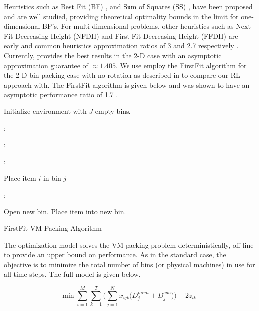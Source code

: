 \documentclass[12pt]{article}
\begin{document}
Heuristics such as Best Fit (BF) \citep{Johnson1974}, and Sum of Squares (SS) \citep{Csirik2006}, have been proposed and are well studied, providing theoretical optimality bounds in the limit for one-dimensional BP's. 
For multi-dimensional problems, other heuristics such as Next Fit Decreasing Height (NFDH) and First Fit Decreasing Height (FFDH) are early and common heuristics approximation ratios of 3 and 2.7 respectively \citep{Christensen2017}. 
Currently, \citet{Bansal2016} provides the best results in the 2-D case with an asymptotic approximation guarantee of $\approx 1.405$.
We use employ the FirstFit algorithm for the 2-D bin packing case with no rotation as described in \cite{Garey1972} to compare our RL approach with.
The FirstFit algorithm is given below and was shown to have an asymptotic performance ratio of 1.7 \citep{Baker1983}.

\begin{algorithm}
\begin{algorithmic}[1]
\Require
Initialize environment with $J$ empty bins.\par
{}: \par
    : \par
        : \par
            Place item $i$ in bin $j$ \par
        \EndIf \par
    \EndFor \par
    : \par
        Open new bin. Place item into new bin. \par
    \EndIf \par
\EndFor
\end{algorithmic}
\caption{\footnotesize FirstFit VM Packing Algorithm}
\label{algo:ff_vmpacking}
\end{algorithm}

The optimization model solves the VM packing problem deterministically, off-line to provide an upper bound on performance. As in the standard case, the objective is to minimize the total number of bins (or physical machines) in use for all time steps. The full model is given below.

\begin{equation}
    \textrm{min}\; \sum_{i=1}^M  \sum_{k=1}^T \bigg( \sum_{j=1}^N x_{ijk} (D_j^{mem} + D_j^{cpu} \big) \bigg) - 2 z_{ik}
\label{eq:vm_packing_obj}
\end{equation}
\end{document}
